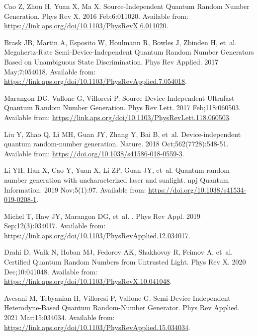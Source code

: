 \documentclass[]{interact}
\theoremstyle{plain}%
\theoremstyle{definition}
\theoremstyle{remark}
\begin{document}
\begin{thebibliography}{100}
Cao Z, Zhou H, Yuan X, Ma X.
\newblock Source-Independent Quantum Random Number Generation.
\newblock Phys Rev X. 2016 Feb;6:011020.
\newblock Available from:
  \url{https://link.aps.org/doi/10.1103/PhysRevX.6.011020}.

Brask JB, Martin A, Esposito W, Houlmann R, Bowles J, Zbinden H, et~al.
\newblock Megahertz-Rate Semi-Device-Independent Quantum Random Number
  Generators Based on Unambiguous State Discrimination.
\newblock Phys Rev Applied. 2017 May;7:054018.
\newblock Available from:
  \url{https://link.aps.org/doi/10.1103/PhysRevApplied.7.054018}.

Marangon DG, Vallone G, Villoresi P.
\newblock Source-Device-Independent Ultrafast Quantum Random Number Generation.
\newblock Phys Rev Lett. 2017 Feb;118:060503.
\newblock Available from:
  \url{https://link.aps.org/doi/10.1103/PhysRevLett.118.060503}.

Liu Y, Zhao Q, Li MH, Guan JY, Zhang Y, Bai B, et~al.
\newblock Device-independent quantum random-number generation.
\newblock Nature. 2018 Oct;562(7728):548-51.
\newblock Available from: \url{https://doi.org/10.1038/s41586-018-0559-3}.

Li YH, Han X, Cao Y, Yuan X, Li ZP, Guan JY, et~al.
\newblock Quantum random number generation with uncharacterized laser and
  sunlight.
\newblock npj Quantum Information. 2019 Nov;5(1):97.
\newblock Available from: \url{https://doi.org/10.1038/s41534-019-0208-1}.

Michel T, Haw JY, Marangon DG, et~al.
.
\newblock Phys Rev Appl. 2019 Sep;12(3):034017.
\newblock Available from:
  \url{https://link.aps.org/doi/10.1103/PhysRevApplied.12.034017}.

Drahi D, Walk N, Hoban MJ, Fedorov AK, Shakhovoy R, Feimov A, et~al.
\newblock Certified Quantum Random Numbers from Untrusted Light.
\newblock Phys Rev X. 2020 Dec;10:041048.
\newblock Available from:
  \url{https://link.aps.org/doi/10.1103/PhysRevX.10.041048}.

Avesani M, Tebyanian H, Villoresi P, Vallone G.
\newblock Semi-Device-Independent Heterodyne-Based Quantum Random-Number
  Generator.
\newblock Phys Rev Applied. 2021 Mar;15:034034.
\newblock Available from:
  \url{https://link.aps.org/doi/10.1103/PhysRevApplied.15.034034}.


\end{thebibliography}
\end{document}

